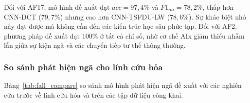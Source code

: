 \begin{table}[!htb]
    \caption{So sánh hiệu suất nhận dạng trên tập dữ liệu UniMiB-SHAR}
    \label{tab:unimib}
    \centering
    \footnotesize
    \renewcommand{\arraystretch}{1.2}
\end{table}

Đối với AF17, mô hình đề xuất đạt $acc = 97{,}4\%$ và $F1_{mi} = 78{,}2\%$, thấp hơn CNN-DCT \cite{HAR_DCT_deeplearning2023} ($79{,}7\%$) nhưng cao hơn CNN-TSFDU-LW \cite{HAR_CNN_2025} ($78{,}6\%$). Sự khác biệt nhỏ này đạt được mà không cần đến các kiến trúc học sâu phức tạp. Đối với AF2, phương pháp đề xuất đạt 100\% ở tất cả chỉ số, nhờ cơ chế AIx giảm thiểu nhầm lẫn giữa sự kiện ngã và các chuyển tiếp tư thế thông thường.

\subsubsection{So sánh phát hiện ngã cho lính cứu hỏa}

Bảng~\ref{tab:fall_compare} so sánh mô hình phát hiện ngã đề xuất với các nghiên cứu trước về lính cứu hỏa và trên các tập dữ liệu công khai.


